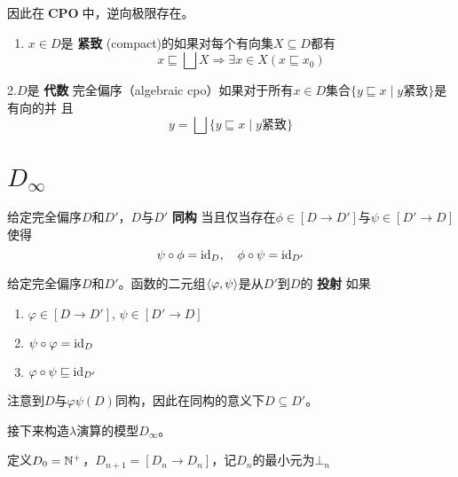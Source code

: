 \documentclass[11pt]{article}
\DeclareMathOperator{\CPO}{\textbf{CPO}}
\begin{document}
因此在\(\CPO\)中，逆向极限存在。

\begin{definition}[]
\begin{enumerate}
\item \(x\in D\)是 \textbf{紧致} (compact)的如果对每个有向集\(X\subseteq D\)都有
\begin{equation*}
x\sqsubseteq\bigsqcup X\Rightarrow \exists x\in X(x\sqsubseteq x_0)
\end{equation*}
\end{enumerate}
2.\(D\)是 \textbf{代数} 完全偏序（algebraic cpo）如果对于所有\(x\in D\)集合\(\{y\sqsubseteq x\mid y\text{紧致}\}\)是有向的并
且
\begin{equation*}
y=\bigsqcup\{y\sqsubseteq x\mid y\text{紧致}\}
\end{equation*}
\end{definition}

\section{\texorpdfstring{\(D_\infty\)}{D}}
\label{sec:org4ef5cb0}
\begin{definition}[]
给定完全偏序\(D\)和\(D'\)，\(D\)与\(D'\) \textbf{同构} 当且仅当存在\(\phi\in[D\to D']\)与\(\psi\in[D'\to D]\)使得
\begin{equation*}
\psi\circ\phi=\operatorname{id}_D,\quad\phi\circ\psi=\operatorname{id}_{D'}
\end{equation*}
\end{definition}


\begin{definition}[]
给定完全偏序\(D\)和\(D'\)。函数的二元组\(\langle\varphi,\psi\rangle\)是从\(D'\)到\(D\)的 \textbf{投射} 如果
\begin{enumerate}
\item \(\varphi\in[D\to D']\), \(\psi\in[D'\to D]\)
\item \(\psi\circ\varphi=\operatorname{id}_D\)
\item \(\varphi\circ\psi\sqsubseteq\operatorname{id}_{D'}\)
\end{enumerate}
\end{definition}

注意到\(D\)与\(\varphi\psi(D)\)同构，因此在同构的意义下\(D\subseteq D'\)。

接下来构造\(\lambda\)演算的模型\(D_\infty\)。

\begin{definition}[]
定义\(D_0=\mathbb{N}^+\)，\(D_{n+1}=[D_n\to D_n]\)，记\(D_n\)的最小元为\(\bot_n\)
\end{definition}
\end{document}
